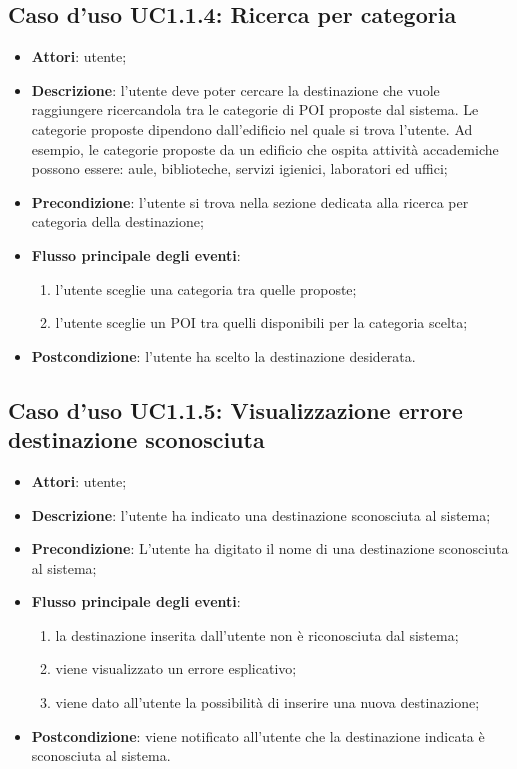\documentclass[../AnalisiDeiRequisiti.tex]{subfiles}
\begin{document}
\subsection{Caso d'uso UC1.1.4: Ricerca per categoria}
\begin{itemize}
\item \textbf{Attori}: utente;
\item \textbf{Descrizione}: l'utente deve poter cercare la destinazione che vuole raggiungere ricercandola tra le categorie di POI proposte dal sistema. Le categorie proposte dipendono dall'edificio nel quale si trova l'utente. Ad esempio, le categorie proposte da un edificio che ospita attività accademiche possono essere: aule, biblioteche, servizi igienici, laboratori ed uffici; 
      \item \textbf{Precondizione}: l'utente si trova nella sezione dedicata alla ricerca per categoria della destinazione;

        \item \textbf{Flusso principale degli eventi}:
          \begin{enumerate}
          \item l'utente sceglie una categoria tra quelle proposte;
          \item l'utente sceglie un POI tra quelli disponibili per la categoria scelta;

      \end{enumerate}
    \item \textbf{Postcondizione}: l'utente ha scelto la destinazione desiderata.
  \end{itemize}
\hypertarget{UC1.1.5}{}
\subsection{Caso d'uso UC1.1.5: Visualizzazione errore destinazione sconosciuta}
\begin{itemize}
\item \textbf{Attori}: utente;
\item \textbf{Descrizione}: l'utente ha indicato una destinazione sconosciuta al sistema; 
      \item \textbf{Precondizione}: L'utente ha digitato il nome di una destinazione sconosciuta al sistema;

        \item \textbf{Flusso principale degli eventi}:
          \begin{enumerate}
          \item la destinazione inserita dall'utente non è riconosciuta dal sistema;
          \item viene visualizzato un errore esplicativo;
          \item viene dato all'utente la possibilità di inserire una nuova destinazione;

      \end{enumerate}
    \item \textbf{Postcondizione}: viene notificato all'utente che la destinazione indicata è sconosciuta al sistema.
  \end{itemize}
\hypertarget{UC1.2}{}
\end{document}
